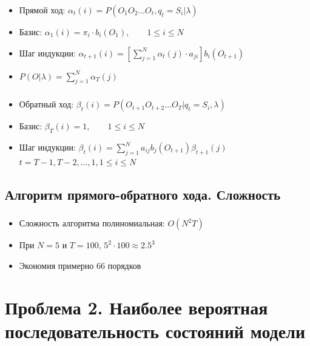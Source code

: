\documentclass{beamer}
\begin{document}
\begin{frame}
  \frametitle{\insertsection}
  \framesubtitle{\insertsubsection}
  \begin{itemize}
  \item Прямой ход: $ \alpha_t(i) = P(O_1 O_2 \ldots O_t, q_t = S_i | \lambda)$
    \pause
  \item Базис: $ \alpha_1(i) = \pi_i \cdot b_i(O_1), \qquad 1 \le i \le N$
  \item Шаг индукции: $\displaystyle \alpha_{t + 1}(i) = \left [ \sum_{j = 1}^{N} \alpha_t(j) \cdot a_{ji} \right ] b_i(O_{t + 1})$
    \pause
  \item $\displaystyle P(O|\lambda) = \sum_{j = 1}^{N} \alpha_T(j)$
  \end{itemize}
\end{frame}

\begin{frame}
  \frametitle{\insertsection}
  \framesubtitle{\insertsubsection}
  \begin{itemize}
  \item Обратный ход: $ \beta_t(i) = P(O_{t + 1} O_{t + 2} \ldots O_T | q_t = S_i , \lambda)$
    \pause
  \item Базис: $ \beta_T(i) = 1, \qquad 1 \le i \le N$
  \item Шаг индукции: $\displaystyle \beta_{t}(i) = \sum_{j = 1}^{N} a_{ij} b_{j}(O_{t + 1})\beta_{t + 1}(j)$ \\
    $t = T - 1, T - 2, \ldots, 1, 1 \le i \le N$
  \end{itemize}
\end{frame}

\subsection{Алгоритм прямого-обратного хода. Сложность}

\begin{frame}
  \frametitle{\insertsection}
  \framesubtitle{\insertsubsection}
  \begin{itemize}
  \item Сложность алгоритма полиномиальная: $O(N^2T)$
    \pause
  \item При $N = 5$ и  $T = 100$, $5^2 \cdot 100 \approx 2.5^3$ \pause
    \item Экономия примерно $66$ порядков
  \end{itemize}
\end{frame}

\section{Проблема 2. Наиболее вероятная последовательность состояний модели}
\end{document}
